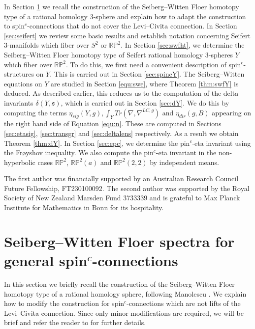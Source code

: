 \documentclass{amsart}
\theoremstyle{definition}
\theoremstyle{remark}
\numberwithin{equation}{section}
\begin{document}
In Section \ref{sec:swf} we recall the construction of the Seiberg--Witten Floer homotopy type of a rational homology $3$-sphere and explain how to adapt the construction to spin$^c$-connections that do not cover the Levi--Civita connection. In Section \ref{sec:seifert} we review some basic results and establish notation concerning Seifert $3$-manifolds which fiber over $S^2$ or $\mathbb{RP}^2$. In Section \ref{sec:swfht}, we determine the Seiberg--Witten Floer homotopy type of Seifert rational homology $3$-spheres $Y$ which fiber over $\mathbb{RP}^2$. To do this, we first need a convenient description of spin$^c$-structures on $Y$. This is carried out in Section \ref{sec:spincY}. The Seiberg--Witten equations on $Y$ are studied in Section \ref{equ:swe}, where Theorem \ref{thm:swfY} is deduced. As described earlier, this reduces us to the computation of the delta invariants $\delta(Y , \mathfrak{s})$, which is carried out in Section \ref{sec:dY}. We do this by computing the terms $\eta_{sig}(Y,g), \int_Y Tr(\nabla , \nabla^{LC,g})$ and $\eta_{dir}(g,B)$ appearing on the right hand side of Equation \ref{equ:n}. These are computed in Sections \ref{sec:etasig}, \ref{sec:transgr} and \ref{sec:deltalens} respectively. As a result we obtain Theorem \ref{thm:dY}. In Section \ref{sec:epc}, we determine the pin$^c$-eta invariant using the Fr\o yshov inequality. We also compute the pin$^c$-eta invariant in the non-hyperbolic cases $\mathbb{RP}^2$, $\mathbb{RP}^2(a)$ and $\mathbb{RP}^2(2,2)$ by independent means.

 The first author was financially supported by an Australian Research Council Future Fellowship, FT230100092.  The second author was supported by the Royal Society of New Zealand Marsden Fund 3733339 and is grateful to Max Planck Institute for Mathematics in
Bonn for its hospitality.



\section{Seiberg--Witten Floer spectra for general spin$^c$-connections}\label{sec:swf}

In this section we briefly recall the construction of the Seiberg--Witten Floer homotopy type of a rational homology sphere, following Manolescu \cite{man}. We explain how to modify the construction for spin$^c$-connections which are not lifts of the Levi--Civita connection. Since only minor modifications are required, we will be brief and refer the reader to \cite{man} for further details.
\end{document}
